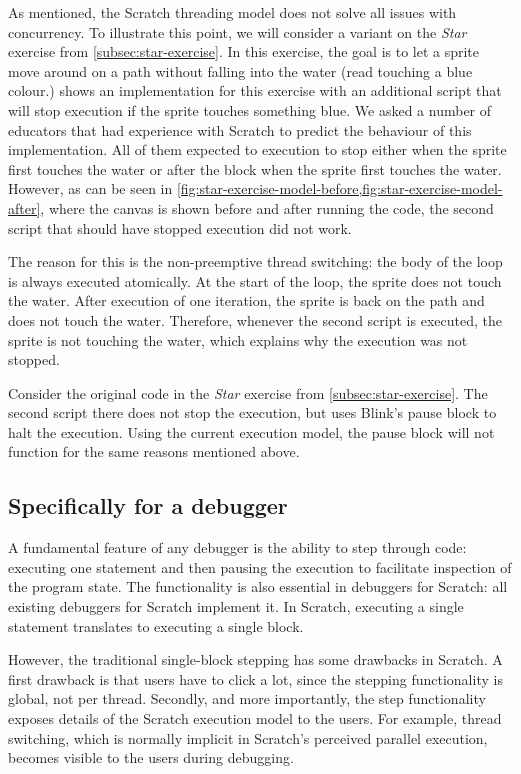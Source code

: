 \documentclass[../main]{subfiles}
\begin{document}
As \textcite{maloneyScratchProgrammingLanguage2010} mentioned, the Scratch threading model does not solve all issues with concurrency.
To illustrate this point, we will consider a variant on the \emph{Star} exercise from \cref{subsec:star-exercise}.
In this exercise, the goal is to let a sprite move around on a path without falling into the water (read touching a blue colour.)
 shows an implementation for this exercise with an additional script that will stop execution if the sprite touches something blue.
We asked a number of educators that had experience with Scratch to predict the behaviour of this implementation.
All of them expected to execution to stop either when the sprite first touches the water or after the block when the sprite first touches the water.
However, as can be seen in \cref{fig:star-exercise-model-before,fig:star-exercise-model-after}, where the canvas is shown before and after running the code, the second script that should have stopped execution did not work.

The reason for this is the non-preemptive thread switching: the body of the loop is always executed atomically.
At the start of the loop, the sprite does not touch the water.
After execution of one iteration, the sprite is back on the path and does not touch the water.
Therefore, whenever the second script is executed, the sprite is not touching the water, which explains why the execution was not stopped.

Consider the original code in the \emph{Star} exercise from \cref{subsec:star-exercise}.
The second script there does not stop the execution, but uses Blink's pause block to halt the execution.
Using the current execution model, the pause block will not function for the same reasons mentioned above.

\subsection{Specifically for a debugger}\label{subsec:specifically-for-a-debugger}

A fundamental feature of any debugger is the ability to step through code: executing one statement and then pausing the execution to facilitate inspection of the program state.
The functionality is also essential in debuggers for Scratch: all existing debuggers for Scratch implement it.
In Scratch, executing a single statement translates to executing a single block.

However, the traditional single-block stepping has some drawbacks in Scratch.
A first drawback is that users have to click a lot, since the stepping functionality is global, not per thread.
Secondly, and more importantly, the step functionality exposes details of the Scratch execution model to the users.
For example, thread switching, which is normally implicit in Scratch's perceived parallel execution, becomes visible to the users during debugging.
\end{document}
